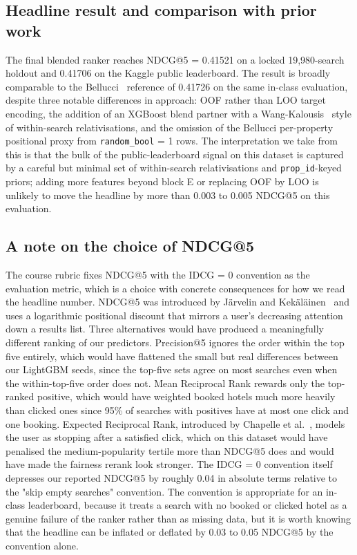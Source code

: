 
\subsection{Headline result and comparison with prior work}

The final blended ranker reaches NDCG@5 = 0.41521 on a locked 19{,}980-search holdout and 0.41706 on the Kaggle public leaderboard. The result is broadly comparable to the Bellucci~\cite{bellucci2021dmt} reference of 0.41726 on the same in-class evaluation, despite three notable differences in approach: OOF rather than LOO target encoding, the addition of an XGBoost blend partner with a Wang-Kalousis~\cite{wang2014expedia} style of within-search relativisations, and the omission of the Bellucci per-property positional proxy from \texttt{random\_bool} = 1 rows. The interpretation we take from this is that the bulk of the public-leaderboard signal on this dataset is captured by a careful but minimal set of within-search relativisations and \texttt{prop\_id}-keyed priors; adding more features beyond block E or replacing OOF by LOO is unlikely to move the headline by more than 0.003 to 0.005 NDCG@5 on this evaluation.

\subsection{A note on the choice of NDCG@5}

The course rubric fixes NDCG@5 with the IDCG = 0 convention as the evaluation metric, which is a choice with concrete consequences for how we read the headline number. NDCG@5 was introduced by J\"arvelin and Kek\"al\"ainen~\cite{jarvelin2002ndcg} and uses a logarithmic positional discount that mirrors a user's decreasing attention down a results list. Three alternatives would have produced a meaningfully different ranking of our predictors. Precision@5 ignores the order within the top five entirely, which would have flattened the small but real differences between our LightGBM seeds, since the top-five sets agree on most searches even when the within-top-five order does not. Mean Reciprocal Rank rewards only the top-ranked positive, which would have weighted booked hotels much more heavily than clicked ones since 95\% of searches with positives have at most one click and one booking. Expected Reciprocal Rank, introduced by Chapelle et al.~\cite{chapelle2009expected}, models the user as stopping after a satisfied click, which on this dataset would have penalised the medium-popularity tertile more than NDCG@5 does and would have made the fairness rerank look stronger. The IDCG = 0 convention itself depresses our reported NDCG@5 by roughly 0.04 in absolute terms relative to the "skip empty searches" convention. The convention is appropriate for an in-class leaderboard, because it treats a search with no booked or clicked hotel as a genuine failure of the ranker rather than as missing data, but it is worth knowing that the headline can be inflated or deflated by 0.03 to 0.05 NDCG@5 by the convention alone.

